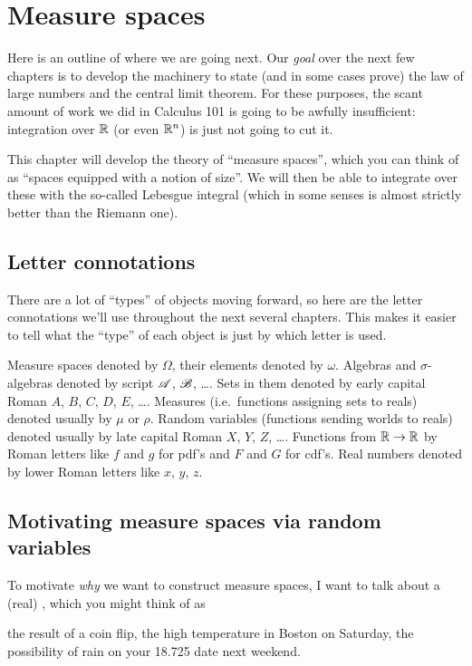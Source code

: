 \chapter{Measure spaces}
\label{ch:measure_space}
Here is an outline of where we are going next.
Our \emph{goal} over the next few chapters
is to develop the machinery to state (and in some cases prove)
the law of large numbers and the central limit theorem.
For these purposes, the scant amount of work we did in Calculus 101
is going to be awfully insufficient:
integration over $\mathbb R$ (or even $\mathbb R^n$) is just not going to cut it.

This chapter will develop the theory of ``measure spaces'',
which you can think of as ``spaces equipped with a notion of size''.
We will then be able to integrate over these
with the so-called Lebesgue integral
(which in some senses is almost strictly better than the Riemann one).

\section{Letter connotations}
There are a lot of ``types'' of objects moving forward,
so here are the letter connotations we'll use
throughout the next several chapters.
This makes it easier to tell what the ``type'' of each object
is just by which letter is used.
\begin{itemize}
	\ii Measure spaces denoted by $\Omega$,
	their elements denoted by $\omega$.
	\ii Algebras and $\sigma$-algebras denoted by script $\mathscr A$, $\mathscr B$, \dots.
	Sets in them denoted by early capital Roman $A$, $B$, $C$, $D$, $E$, \dots.
	\ii Measures (i.e.\ functions assigning sets to reals)
	denoted usually by $\mu$ or $\rho$.
	\ii Random variables (functions sending worlds to reals)
	denoted usually by late capital Roman $X$, $Y$, $Z$, \dots.
	\ii Functions from $\mathbb R \to \mathbb R$
	by Roman letters like $f$ and $g$ for pdf's
	and $F$ and $G$ for cdf's.
	\ii Real numbers denoted by lower Roman letters like $x$, $y$, $z$.
\end{itemize}


\section{Motivating measure spaces via random variables}
To motivate \emph{why} we want to construct measure spaces,
I want to talk about a (real) ,
which you might think of as
\begin{itemize}
	\ii the result of a coin flip,
	\ii the high temperature in Boston on Saturday,
	\ii the possibility of rain on your 18.725 date next weekend.
\end{itemize}

